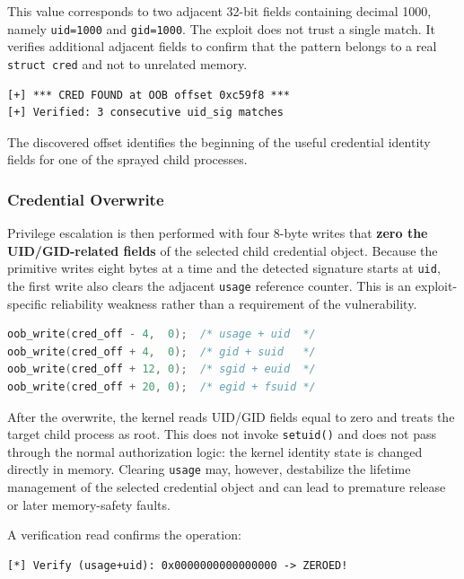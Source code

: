 \documentclass[../main.tex]{subfiles}
\begin{document}
This value corresponds to two adjacent 32-bit fields containing decimal 1000, namely \texttt{uid=1000} and \texttt{gid=1000}. The exploit does not trust a single match. It verifies additional adjacent fields to confirm that the pattern belongs to a real \texttt{struct cred} and not to unrelated memory.

\begin{lstlisting}[caption={Credential discovery output.}]
[+] *** CRED FOUND at OOB offset 0xc59f8 ***
[+] Verified: 3 consecutive uid_sig matches
\end{lstlisting}

The discovered offset identifies the beginning of the useful credential identity fields for one of the sprayed child processes.

\subsubsection{Credential Overwrite}

Privilege escalation is then performed with four 8-byte writes that \textbf{zero the UID/GID-related fields} of the selected child credential object. Because the primitive writes eight bytes at a time and the detected signature starts at \texttt{uid}, the first write also clears the adjacent \texttt{usage} reference counter. This is an exploit-specific reliability weakness rather than a requirement of the vulnerability.

\begin{lstlisting}[language=C, caption={Credential overwrite strategy.}]
oob_write(cred_off - 4,  0);  /* usage + uid  */
oob_write(cred_off + 4,  0);  /* gid + suid   */
oob_write(cred_off + 12, 0);  /* sgid + euid  */
oob_write(cred_off + 20, 0);  /* egid + fsuid */
\end{lstlisting}

After the overwrite, the kernel reads UID/GID fields equal to zero and treats the target child process as root. This does not invoke \texttt{setuid()} and does not pass through the normal authorization logic: the kernel identity state is changed directly in memory. Clearing \texttt{usage} may, however, destabilize the lifetime management of the selected credential object and can lead to premature release or later memory-safety faults.

A verification read confirms the operation:

\begin{lstlisting}[caption={Credential overwrite verification.}]
[*] Verify (usage+uid): 0x0000000000000000 -> ZEROED!
\end{lstlisting}
\end{document}
